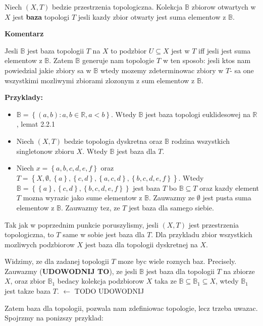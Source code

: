 \documentclass{article}
\begin{document}
\begin{tcolorbox}[colback=white!90!red,colframe=black!35!red,title=2.2.2 Definicja: Baza topologii]

    Niech $(X,T)$ bedzie przestrzenia topologiczna. Kolekcja $\mathbb{B}$ zbiorow otwartych w $X$ jest \textbf{baza} topologi $T$ jesli kazdy zbior otwarty jest suma elementow z $\mathbb{B}$.

\end{tcolorbox}


\textbf{Komentarz}

Jesli $\mathbb{B}$ jest baza topologii $T$ na $X$ to podzbior $U \subseteq X$ jest w $T$ iff jesli jest suma elementow z $\mathbb{B}$. Zatem $\mathbb{B}$ generuje nam topologie $T$ w ten sposob: jesli ktos nam powiedzial jakie zbiory sa w $\mathbb{B}$ wtedy mozemy zdeterminowac zbiory w $T$- sa one wszystkimi mozliwymi zbiorami zlozonym z sum elementow z $\mathbb{B}$.

\textbf{Przyklady:}
\begin{itemize}
    \item $\mathbb{B} = \left\{ (a,b): a,b \in \mathbb{R}, a<b \right\}$. Wtedy $\mathbb{B}$ jest baza topologi euklidesowej na $\mathbb{R}$, lemat 2.2.1
    \item Niech $(X,T)$ bedzie topologia dyskretna oraz $\mathbb{B}$ rodzina wszystkich singletonow zbioru $X$. Wtedy $\mathbb{B}$ jest baza dla $T$.
    \item Niech $x = \left\{ a,b,c,d,e,f \right\}$ oraz $T = \left\{ X, \emptyset, \left\{ a \right\}, \left\{ c,d \right\}, \left\{ a,c,d \right\}, \left\{ b,c,d,e,f \right\}   \right\}$. Wtedy $\mathbb{B} = \left\{ \left\{ a \right\}, \left\{ c,d \right\}, \left\{ b,c,d,e,f \right\}  \right\}$ jest baza $T$ bo $\mathbb{B} \subseteq T$ oraz kazdy element $T$ mozna wyrazic jako sume elementow z $\mathbb{B}$. Zauwazmy ze $\emptyset$ jest pusta suma elementow z $\mathbb{B}$. Zauwazmy tez, ze $T$ jest baza dla samego siebie.
\end{itemize}

\begin{tcolorbox}[colback=white!90!green,colframe=black!35!green,title=2.2.6 Lematokomentarz: Rozne bazy dla tej samej topologii]

    Tak jak w poprzednim punkcie poruszylismy, jesli $(X,T)$ jest przestrzenia topologiczna, to $T$ same w sobie jest baza dla $T$. Dla przykladu zbior wszystkich mozliwych podzbiorow $X$ jest baza dla topologii dyskretnej na $X$.

    Widzimy, ze dla zadanej topologii $T$ moze byc wiele roznych baz. Precisely. Zauwazmy (\textbf{UDOWODNIJ TO}), ze jesli $\mathbb{B}$ jest baza dla topologii $T$ na zbiorze $X$, oraz zbior $\mathbb{B}_{1}$ bedacy kolekcja podzbiorow $X$ taka ze $\mathbb{B} \subseteq \mathbb{B}_{1} \subseteq X$, wtedy $\mathbb{B}_{1}$ jest takze baza $T$. $\leftarrow$ TODO UDOWODNIJ

\end{tcolorbox}
Zatem baza dla topologii, pozwala nam zdefiniowac topologie, lecz trzeba uwazac. Spojrzmy na ponizszy przyklad:
\end{document}
